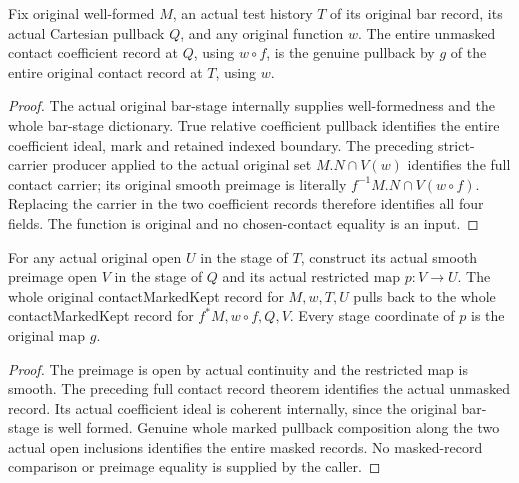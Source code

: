 \begin{theorem}
\label{hir:smooth-original-contact-whole-coefficient-record}
\leanok
{}
Fix original well-formed $M$, an actual test history $T$ of its original
bar record, its actual Cartesian pullback $Q$, and any original function
$w$. The entire unmasked contact coefficient record at $Q$, using
$w\circ f$, is the genuine pullback by $g$ of the entire original contact
record at $T$, using $w$.
\end{theorem}
\begin{proof}
The actual original bar-stage internally supplies well-formedness and the
whole bar-stage dictionary. True relative coefficient pullback identifies
the entire coefficient ideal, mark and retained indexed boundary. The
preceding strict-carrier producer applied to the actual original set
$M.N\cap V(w)$ identifies the full contact carrier; its original smooth
preimage is literally $f^{-1}M.N\cap V(w\circ f)$. Replacing the carrier
in the two coefficient records therefore identifies all four fields.
The function is original and no chosen-contact equality is an input.
\end{proof}

\begin{theorem}
\label{hir:smooth-original-contact-actual-open-record}
\leanok
{}
For any actual original open $U$ in the stage of $T$, construct its actual
smooth preimage open $V$ in the stage of $Q$ and its actual restricted map
$p:V\to U$. The whole original contactMarkedKept record for $M,w,T,U$
pulls back to the whole contactMarkedKept record for $f^*M,w\circ f,Q,V$.
Every stage coordinate of $p$ is the original map $g$.
\end{theorem}
\begin{proof}
The preimage is open by actual continuity and the restricted map is smooth.
The preceding full contact record theorem identifies the actual unmasked
record. Its actual coefficient ideal is coherent internally, since the
original bar-stage is well formed. Genuine whole marked pullback composition
along the two actual open inclusions identifies the entire masked records.
No masked-record comparison or preimage equality is supplied by the caller.
\end{proof}

